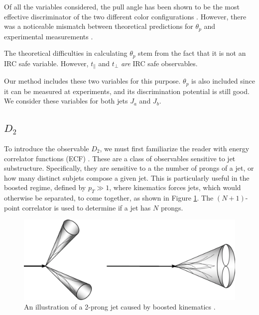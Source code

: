 \documentclass[10pt,a4paper]{book}
\begin{document}
Of all the variables considered, the pull angle has been shown to be the most effective discriminator of the two different color configurations \cite{Gallicchio:2010sw}. However, there was a noticeable mismatch between theoretical predictions for $\theta_p$ and experimental measurements \cite{Larkoski:2019urm}. 

The theoretical difficulties in calculating $\theta_p$ stem from the fact that it is not an IRC safe variable. However, $t_\parallel$ and $t_\perp$ \emph{are} IRC safe observables. 

Our method includes these two variables for this purpose. $\theta_p$ is also included since it can be measured at experiments, and its discrimination potential is still good. We consider these variables for both jets $J_a$ and $J_b$. 

\subsection{$D_2$}

To introduce the observable $D_2$, we must first familiarize the reader with energy correlator functions (ECF) \cite{Larkoski:2013eya}. These are a class of observables sensitive to jet substructure. Specifically, they are sensitive to a the number of prongs of a jet, or how many distinct subjets compose a given jet. This is particularly useful in the boosted regime, defined by $p_T \gg 1$, where kinematics forces jets, which would otherwise be separated, to come together, as shown in Figure \ref{two pronged boost}. The $(N+1)$-point correlator is used to determine if a jet has $N$ prongs.

\begin{figure}[ht]
\centering
\includegraphics[scale=0.35]{ch4_images/two_prong}
\caption{An illustration of a 2-prong jet caused by boosted kinematics \cite{jet_image}.}
\label{two pronged boost}
\end{figure}
\end{document}
